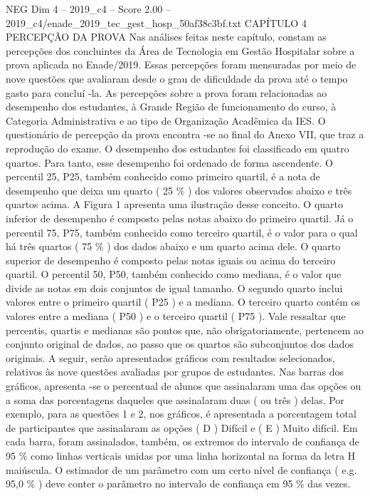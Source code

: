 \begin{textsample}{NEG Dim 4 – 2019\_c4 – Score 2.00 – 2019\_c4/enade\_2019\_tec\_gest\_hosp\_50af38c3bf.txt}  \label{ex:f4_neg_246}
CAPÍTULO 4 PERCEPÇÃO DA PROVA Nas análises feitas neste capítulo, constam as percepções dos concluintes da Área de Tecnologia em Gestão Hospitalar sobre a prova aplicada no Enade/2019.
Essas percepções foram mensuradas por meio de nove questões que avaliaram desde o grau de dificuldade da prova até o tempo gasto para concluí -la.
As percepções sobre a prova foram relacionadas ao desempenho dos estudantes, à Grande Região de funcionamento do curso, à Categoria Administrativa e ao tipo de Organização Acadêmica da IES.
O questionário de percepção da prova encontra -se ao final do Anexo VII, que traz a reprodução do exame.
O desempenho dos estudantes foi classificado em quatro quartos.
Para tanto, esse desempenho foi ordenado de forma ascendente.
O percentil 25, P25, também conhecido como primeiro quartil, é a nota de desempenho que deixa um quarto ( 25 \% ) dos valores observados abaixo e três quartos acima.
A Figura 1 apresenta uma ilustração desse conceito.
O quarto inferior de desempenho é composto pelas notas abaixo do primeiro quartil.
Já o percentil 75, P75, também conhecido como terceiro quartil, é o valor para o qual há três quartos ( 75 \% ) dos dados abaixo e um quarto acima dele.
O quarto superior de desempenho é composto pelas notas iguais ou acima do terceiro quartil.
O percentil 50, P50, também conhecido como mediana, é o valor que divide as notas em dois conjuntos de igual tamanho.
O segundo quarto inclui valores entre o primeiro quartil ( P25 ) e a mediana.
O terceiro quarto contém os valores entre a mediana ( P50 ) e o terceiro quartil ( P75 ).
Vale ressaltar que percentis, quartis e medianas são pontos que, não obrigatoriamente, pertencem ao conjunto original de dados, ao passo que os quartos são subconjuntos dos dados originais.
A seguir, serão apresentados gráficos com resultados selecionados, relativos às nove questões avaliadas por grupos de estudantes.
Nas barras dos gráficos, apresenta -se o percentual de alunos que assinalaram uma das opções ou a soma das porcentagens daqueles que assinalaram duas ( ou três ) delas.
Por exemplo, para as questões 1 e 2, nos gráficos, é apresentada a porcentagem total de participantes que assinalaram as opções ( D ) Difícil e ( E ) Muito difícil.
Em cada barra, foram assinalados, também, os extremos do intervalo de confiança de 95 \% como linhas verticais unidas por uma linha horizontal na forma da letra H maiúscula.
O estimador de um parâmetro com um certo nível de confiança ( e.g. 95,0 \% ) deve conter o parâmetro no intervalo de confiança em 95 \% das vezes.

\end{textsample}
